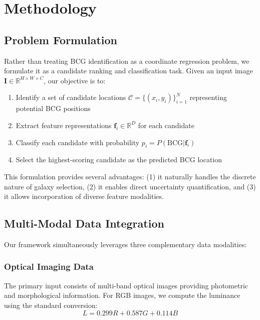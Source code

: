 \documentclass[twocolumn,10pt]{aastex631}
\begin{document}
\section{Methodology}

\subsection{Problem Formulation}

Rather than treating BCG identification as a coordinate regression problem, we formulate it as a candidate ranking and classification task. Given an input image $\mathbf{I} \in \mathbb{R}^{H \times W \times C}$, our objective is to:

\begin{enumerate}
\item Identify a set of candidate locations $\mathcal{C} = \{(x_i, y_i)\}_{i=1}^{N}$ representing potential BCG positions
\item Extract feature representations $\mathbf{f}_i \in \mathbb{R}^{D}$ for each candidate
\item Classify each candidate with probability $p_i = P(\text{BCG}|\mathbf{f}_i)$
\item Select the highest-scoring candidate as the predicted BCG location
\end{enumerate}

This formulation provides several advantages: (1) it naturally handles the discrete nature of galaxy selection, (2) it enables direct uncertainty quantification, and (3) it allows incorporation of diverse feature modalities.

\subsection{Multi-Modal Data Integration}

Our framework simultaneously leverages three complementary data modalities:

\subsubsection{Optical Imaging Data}
The primary input consists of multi-band optical images providing photometric and morphological information. For RGB images, we compute the luminance using the standard conversion:
\begin{equation}
L = 0.299R + 0.587G + 0.114B
\end{equation}
\end{document}
